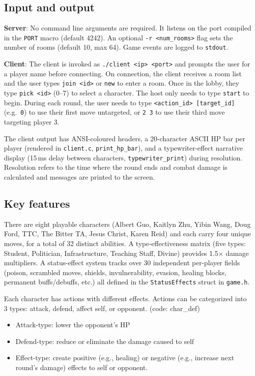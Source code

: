 \documentclass[11pt,letterpaper]{article}
\begin{document}
\subsection*{Input and output}

\textbf{Server}: No command line arguments are required. It listens on the port compiled in the \texttt{PORT} macro (default 4242). An optional \texttt{-r <num\_rooms>} flag sets the number of rooms (default 10, max 64). Game events are logged to \texttt{stdout}.

\textbf{Client}: The client is invoked as \texttt{./client <ip> <port>} and prompts the user for a player name before connecting. On connection, the client receives a room list and the user types \texttt{join <id>} or \texttt{new} to enter a room. Once in the lobby, they type \texttt{pick <id>} (0--7) to select a character. The host only needs to type \texttt{start} to begin. During each round, the user needs to type \texttt{<action\_id> [target\_id]} (e.g.\ \texttt{0}) to use their first move untargeted, or \texttt{2 3} to use their third move targeting player 3.

The client output has ANSI-coloured headers, a 20-character ASCII HP bar per player (rendered in \texttt{client.c}, \texttt{print\_hp\_bar}), and a typewriter-effect narrative display (15\,ms delay between characters, \texttt{typewriter\_print}) during resolution. Resolution refers to the time where the round ends and combat damage is calculated and messages are printed to the screen.

\subsection*{Key features}

There are eight playable characters (Albert Guo, Kaitlyn Zhu, Yibin Wang, Doug Ford, TTC, The Bitter TA, Jesus Christ, Karen Reid) and each carry four unique moves, for a total of 32 distinct abilities. A type-effectiveness matrix (five types: Student, Politician, Infrastructure, Teaching Staff, Divine) provides 1.5$\times$ damage multipliers. A status-effect system tracks over 30 independent per-player fields (poison, scrambled moves, shields, invulnerability, evasion, healing blocks, permanent buffs/debuffs, etc.) all defined in the \texttt{StatusEffects} struct in \texttt{game.h}.

Each character has actions with different effects. Actions can be categorized into 3 types: attack, defend, affect self, or opponent. (code: char\_def)
\begin{itemize}
    \item Attack-type: lower the opponent's HP
    \item Defend-type: reduce or eliminate the damage caused to self
    \item Effect-type: create positive (e.g., healing) or negative (e.g., increase next round's damage) effects to self or opponent.
\end{itemize}
\end{document}
